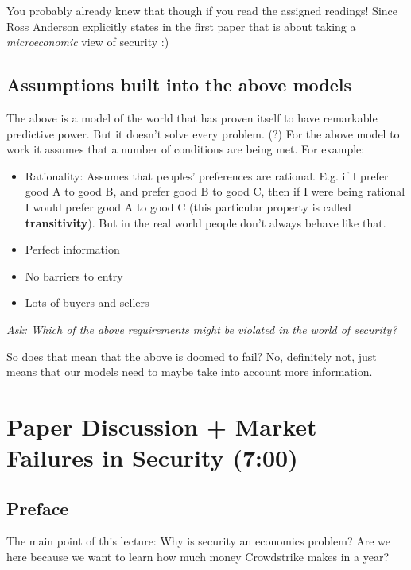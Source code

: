\documentclass[11pt]{article}
\begin{document}
You probably already knew that though if you read the assigned readings! Since Ross Anderson explicitly states in the first paper that is about taking a {\it microeconomic} view of security :) 

\subsection{Assumptions built into the above models}

The above is a model of the world that has proven itself to have remarkable predictive power.
But it doesn't solve every problem. (?)
For the above model to work it assumes that a number of conditions are being met. For example:

\begin{itemize}
    \item Rationality: Assumes that peoples' preferences are rational. E.g. if I prefer good A to good B, and prefer good B to good C, then if I were being rational I would prefer good A to good C (this particular property is called {\bf transitivity}). But in the real world people don't always behave like that.
    \item Perfect information
    \item No barriers to entry
    \item Lots of buyers and sellers
\end{itemize}


{\it Ask: Which of the above requirements might be violated in the world of security?}


So does that mean that the above is doomed to fail? No, definitely not, just means that our models need to maybe take into account more information.




\section{Paper Discussion + Market Failures in Security (7:00)}


\subsection{Preface}

The main point of this lecture: Why is security an economics problem? Are we here because we want to learn how much money Crowdstrike makes in a year?
\end{document}
